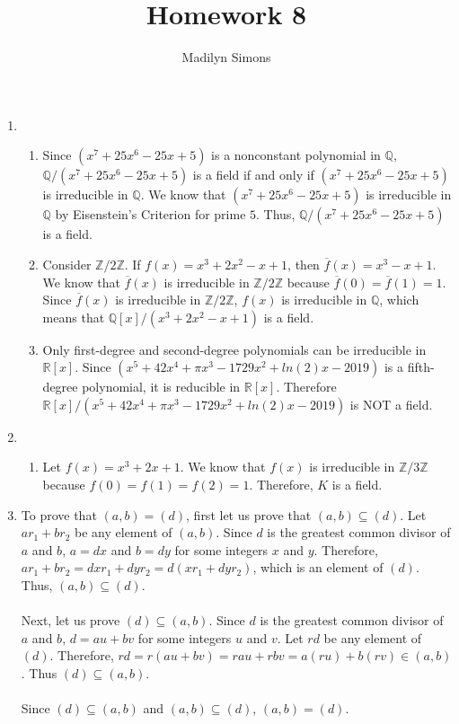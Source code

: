 \documentclass{article}
\title{Homework 8}
\author{Madilyn Simons}
\date{}
\begin{document}
\maketitle

\begin{enumerate}

\item
\begin{enumerate}

\item Since $(x^7 + 25x^6 - 25x + 5)$ is a nonconstant polynomial in
$\mathbb{Q}$, $\mathbb{Q}/(x^7 + 25x^6 - 25x + 5)$ is a field if and only if
$(x^7 + 25x^6 - 25x + 5)$ is irreducible in $\mathbb{Q}$.  We know that
$(x^7 + 25x^6 - 25x + 5)$ is irreducible in $\mathbb{Q}$ by Eisenstein's
Criterion for prime $5$.  Thus, $\mathbb{Q}/(x^7 + 25x^6 - 25x + 5)$ is a field.

\item Consider $\mathbb{Z}/2\mathbb{Z}$.  If $f(x) = x^3 + 2x^2 - x + 1$, then
$\overline{f}(x) = x^3 - x + 1$.  We know that $\overline{f}(x)$ is
irreducible in $\mathbb{Z}/2\mathbb{Z}$ because
$\overline{f}(0) = \overline{f}(1) = 1$.  Since $\overline{f}(x)$ is
irreducible in $\mathbb{Z}/2\mathbb{Z}$, $f(x)$ is irreducible in $\mathbb{Q}$,
which means that $\mathbb{Q}[x]/(x^3 + 2x^2 - x + 1)$ is a field.

\item Only first-degree and second-degree polynomials can be irreducible in
$\mathbb{R}[x]$.  Since $(x^5 + 42x^4 + \pi x^3 -1729x^2 + ln(2)x - 2019)$
is a fifth-degree polynomial, it is reducible in $\mathbb{R}[x]$.  Therefore
$\mathbb{R}[x]/(x^5 + 42x^4 + \pi x^3 -1729x^2 + ln(2)x - 2019)$ is NOT
a field.

\end{enumerate}

\item
\begin{enumerate}
\item
Let $f(x) = x^3 + 2x + 1$.  We know that $f(x)$ is irreducible in
$\mathbb{Z}/3\mathbb{Z}$ because $f(0) = f(1) = f(2) = 1$.  Therefore,
$K$ is a field.

\end{enumerate}

\item To prove that $(a,b) = (d)$, first let us prove that $(a,b) \subseteq (d)$.
Let $ar_1 + br_2$ be any element of $(a,b)$.  Since $d$ is the greatest common
divisor of $a$ and $b$, $a = dx$ and $b = dy$ for some integers $x$ and $y$.
Therefore, $ar_1 + br_2 = dxr_1 + dyr_2 = d(xr_{1} + dyr_{2})$, which is an
element of $(d)$.  Thus, $(a,b) \subseteq (d)$. \\ \\
Next, let us prove $(d) \subseteq (a,b)$.  Since $d$ is the greatest common
divisor of $a$ and $b$, $d = au + bv$ for some integers $u$ and $v$.  Let
$rd$ be any element of $(d)$.
Therefore, $rd = r(au + bv) = rau + rbv = a(ru) + b(rv) \in (a,b)$.
Thus $(d) \subseteq (a,b)$. \\ \\
Since $(d) \subseteq (a,b)$ and $(a,b) \subseteq (d)$, $(a,b) = (d)$.


\end{enumerate}
\end{document}
